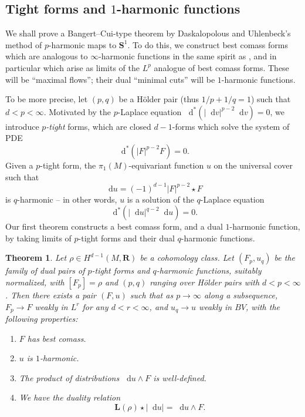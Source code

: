 \documentclass[reqno,11pt]{amsart}
\newcommand{\RR}{\mathbf{R}}
\newcommand{\Sph}{\mathbf S}
\newcommand*\dif{\mathop{}\!\mathrm{d}}
\newcommand{\Comass}{\mathbf L}
\newcommand{\dfn}[1]{\emph{#1}\index{#1}}
\newtheorem{mainthm}{Theorem}
\theoremstyle{definition}
\numberwithin{equation}{section}
\begin{document}

\subsection{\texorpdfstring{Tight forms and $1$-harmonic functions}{Tight forms and one-harmonic functions}}
We shall prove a Bangert--Cui-type theorem by Daskalopolous and Uhlenbeck's method of $p$-harmonic maps to $\Sph^1$.
To do this, we construct best comass forms which are analogous to $\infty$-harmonic functions in the same spirit as \cite{daskalopoulos2020transverse,daskalopoulos2022}, and in particular which arise as limits of the $L^p$ analogue of best comass forms.
These will be ``maximal flows''; their dual ``minimal cuts'' will be $1$-harmonic functions.

To be more precise, let $(p, q)$ be a H\"older pair (thus $1/p + 1/q = 1$) such that $d < p < \infty$.
Motivated by the $p$-Laplace equation $\dif^*(|\dif v|^{p - 2} \dif v) = 0$, we introduce \dfn{$p$-tight} forms, which are closed $d-1$-forms which solve the system of PDE
$$\dif^*(|F|^{p - 2} F) = 0.$$
Given a $p$-tight form, the $\pi_1(M)$-equivariant function $u$ on the universal cover such that
$$\dif u = (-1)^{d - 1} |F|^{p - 2} \star F$$
is $q$-harmonic -- in other words, $u$ is a solution of the $q$-Laplace equation 
$$\dif^*(|\dif u|^{q - 2} \dif u) = 0.$$
Our first theorem constructs a best comass form, and a dual $1$-harmonic function, by taking limits of $p$-tight forms and their dual $q$-harmonic functions.

\begin{mainthm}\label{existence of infinity tight forms}
Let $\rho \in H^{d - 1}(M, \RR)$ be a cohomology class.
Let $(F_p, u_q)$ be the family of dual pairs of $p$-tight forms and $q$-harmonic functions, suitably normalized, with $[F_p] = \rho$ and $(p, q)$ ranging over H\"older pairs with $d < p < \infty$.
Then there exists a pair $(F, u)$ such that as $p \to \infty$ along a subsequence, $F_p \to F$ weakly in $L^r$ for any $d < r < \infty$, and $u_q \to u$ weakly in $BV$, with the following properties:
\begin{enumerate}
\item $F$ has best comass.
\item $u$ is $1$-harmonic.
\item The product of distributions $\dif u \wedge F$ is well-defined.
\item We have the duality relation
\begin{equation}\label{max flow mean cut}
\Comass(\rho) \star |\dif u| = \dif u \wedge F.
\end{equation}
\end{enumerate}
\end{mainthm}
\end{document}

